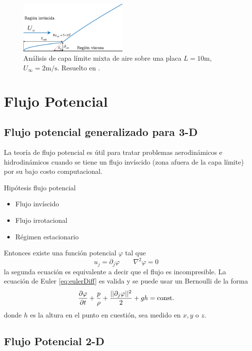 \begin{figure}[htb!]
    \centering
    \includegraphics[width=0.48\textwidth]{fig/BLmixedejemplo.eps}
    \caption{Análisis de capa límite mixta de aire sobre una placa $L=10\si{\meter}$, $U_\infty=2\si{\meter\per\second}$. Resuelto en \Matlab.}
    \label{fig:BLmixedExample}
\end{figure}

\section{Flujo Potencial}
\subsection{Flujo potencial generalizado para 3-D}
La teoría de flujo potencial es útil para tratar problemas aerodinámicos e hidrodinámicos cuando se tiene un flujo invíscido (zona afuera de la capa límite) por su bajo costo computacional.

Hipótesis flujo potencial
\begin{itemize}
    \item Flujo invíscido
    \item Flujo irrotacional
    \item Régimen estacionario
\end{itemize}
Entonces existe una función potencial $\varphi$ tal que
\[
u_j = \partial_j \varphi \qquad \nabla^2\varphi = 0
\]
la segunda ecuación es equivalente a decir que el flujo es incompresible. La ecuación de Euler \eqref{eq:eulerDiff} es valida y se puede usar un Bernoulli de la forma
\begin{equation}
    \frac{\partial \varphi}{\partial t}+\frac{p}{\rho}+\frac{||\partial_j \varphi||^2}{2}+gh=\textrm{const.}
\end{equation}
donde $h$ es la altura en el punto en cuestión, sea medido en $x,y$ o $z$.
\subsection{Flujo Potencial 2-D}

